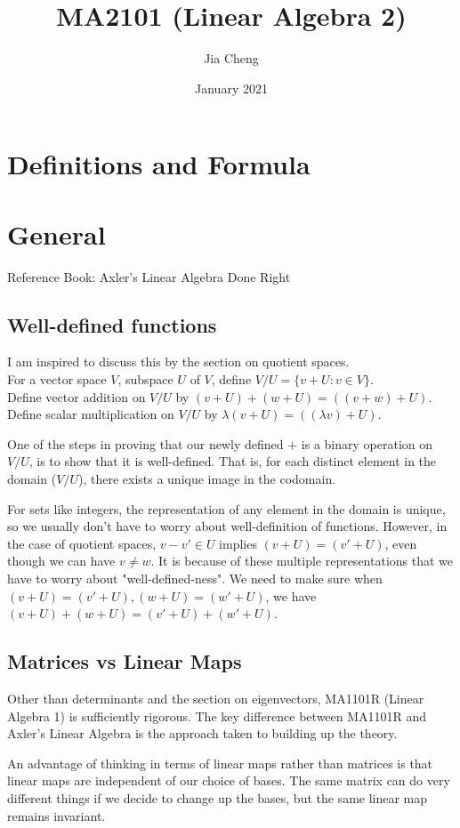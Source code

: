 \documentclass{article}
\title{MA2101 (Linear Algebra 2)}
\author{Jia Cheng}
\date{January 2021}
\begin{document}
\maketitle

\section{Definitions and Formula}


\section{General}
Reference Book: Axler's Linear Algebra Done Right

\subsection{Well-defined functions}
I am inspired to discuss this by the section on quotient spaces.\\
For a vector space $V$, subspace $U$ of $V$, define $V/U=\{v+U : v\in V\}$.\\
Define vector addition on $V/U$ by $(v + U) + (w + U) = ((v+w) + U)$.
Define scalar multiplication on $V/U$ by $\lambda(v+U)=((\lambda v)+U)$.

One of the steps in proving that our newly defined $+$ is a binary operation on $V/U$, is to show that it is well-defined. That is, for each distinct element in the domain ($V/U$), there exists a unique image in the codomain.

For sets like integers, the representation of any element in the domain is unique, so we usually don't have to worry about well-definition of functions. However, in the case of quotient spaces, $v-v' \in U$ implies $(v+U)=(v'+U)$, even though we can have $v\neq w$. It is because of these multiple representations that we have to worry about "well-defined-ness". We need to make sure when $(v+U)=(v'+U),(w+U)=(w'+U)$, we have $(v+U)+(w+U)=(v'+U)+(w'+U)$.

\subsection{Matrices vs Linear Maps}
Other than determinants and the section on eigenvectors, MA1101R (Linear Algebra 1) is sufficiently rigorous.
The key difference between MA1101R and Axler's Linear Algebra is the approach taken to building up the theory.

An advantage of thinking in terms of linear maps rather than matrices is that linear maps are independent of our choice of bases. The same matrix can do very different things if we decide to change up the bases, but the same linear map remains invariant.
\end{document}
